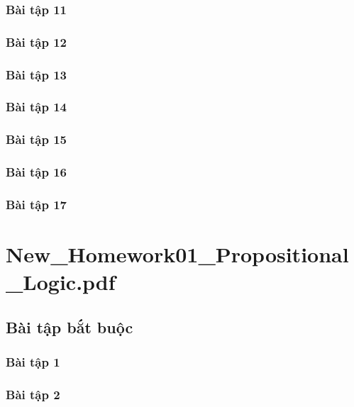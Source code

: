 \documentclass[a4paper]{article}
\begin{document}
\clearpage
\subsubsection{Bài tập 11}

\clearpage
\subsubsection{Bài tập 12}

\clearpage
\subsubsection{Bài tập 13}

\clearpage
\subsubsection{Bài tập 14}

\clearpage
\subsubsection{Bài tập 15}

\clearpage
\subsubsection{Bài tập 16}

\clearpage
\subsubsection{Bài tập 17}

\clearpage
\clearpage

\section{New\_Homework01\_Propositional\_Logic.pdf}
\subsection{Bài tập bắt buộc}
\subsubsection{Bài tập 1}

\clearpage
\subsubsection{Bài tập 2}
\end{document}
